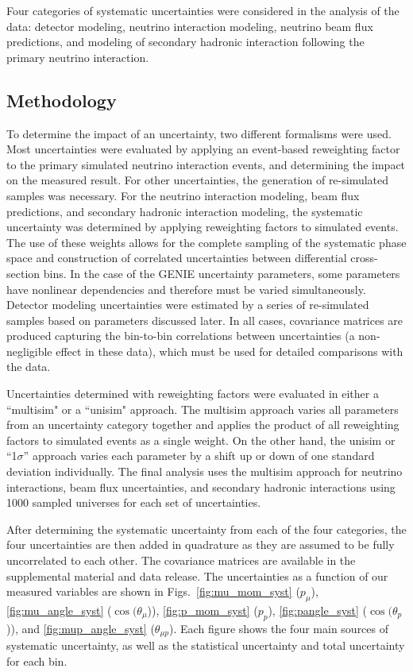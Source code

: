 Four categories of systematic uncertainties were considered in the analysis of the data: detector modeling, neutrino interaction modeling, neutrino beam flux predictions, and modeling of secondary hadronic interaction following the primary neutrino interaction.

\subsection{Methodology} 
To determine the impact of an uncertainty, two different formalisms were used. Most uncertainties were evaluated by applying an event-based reweighting factor to the primary simulated neutrino interaction events, and determining the impact on the measured result. For other uncertainties, the generation of re-simulated samples was necessary. 
For the neutrino interaction modeling, beam flux predictions, and secondary hadronic interaction modeling, the systematic uncertainty was determined by applying reweighting factors to simulated events. The use of these weights allows for the complete sampling of the systematic phase space and construction of correlated uncertainties between differential cross-section bins. In the case of the GENIE uncertainty parameters, some parameters have nonlinear dependencies and therefore must be varied simultaneously. Detector modeling uncertainties were estimated by a series of re-simulated samples based on parameters discussed later.
In all cases, covariance matrices are produced capturing the bin-to-bin correlations between uncertainties (a non-negligible effect in these data), which must be used for detailed comparisons with the data.

Uncertainties determined with reweighting factors were evaluated in either a ``multisim" or a ``unisim" approach. The multisim approach varies all parameters from an uncertainty category together and applies the product of all reweighting factors to simulated events as a single weight. On the other hand, the unisim or “1$\sigma$” approach varies each parameter by a shift up or down of one standard deviation individually. The final analysis uses the multisim approach for neutrino interactions, beam flux uncertainties, and secondary hadronic interactions using 1000 sampled universes for each set of uncertainties. 

After determining the systematic uncertainty from each of the four categories, the four uncertainties are then added in quadrature as they are assumed to be fully uncorrelated to each other. The covariance matrices are available in the supplemental material and data release.
The uncertainties as a function of our measured variables are shown in Figs.~\ref{fig:mu_mom_syst} ($p_\mu$), \ref{fig:mu_angle_syst} ($\cos(\theta_\mu$)), \ref{fig:p_mom_syst} ($p_p$), \ref{fig:pangle_syst} ($\cos(\theta_p$)), and \ref{fig:mup_angle_syst} ($\theta_{\mu p}$).
Each figure shows the four main sources of systematic uncertainty, as well as the statistical uncertainty and total uncertainty for each bin.

